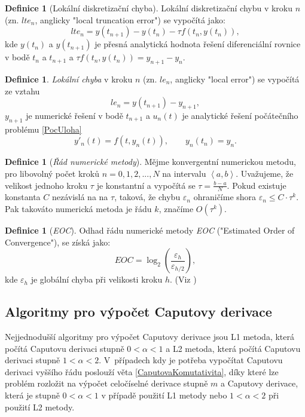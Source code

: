 \documentclass[a4paper,12pt,twoside]{article}
\theoremstyle{definition}
\newtheorem{defin}[veta]{Definice}
\theoremstyle{remark}
\numberwithin{equation}{section}
\numberwithin{table}{section}
\numberwithin{figure}{section}
\begin{document}
\begin{defin} [Lokální diskretizační chyba]
	Lokální diskretizační chybu v kroku $n$ (zn. $lte_{n}$, anglicky "local truncation error") se vypočítá jako:
	$$lte_{n} = y\left(t_{n+1}\right) -y\left(t_{n}\right) - \tau f\left(t_{n}, y\left(t_{n}\right)\right),$$
	kde $y\left(t_{n}\right)$ a $y\left(t_{n+1}\right)$ je přesná analytická hodnota řešení diferenciální rovnice v bodě $t_{n}$ a $t_{n+1}$ a $\tau f\left(t_{n}, y\left(t_{n}\right)\right) = y_{n+1} - y_{n}$.
\end{defin}

\begin{defin}
	\emph{Lokální chyba} v kroku $n$ (zn. $le_{n}$, anglicky "local error") se vypočítá ze vztahu
	$$le_{n} = y\left(t_{n+1}\right) - y_{n+1},$$
	$y_{n+1}$ je numerické řešení v bodě $t_{n+1}$ a $u_{n}\left(t\right)$ je analytické řešení počátečního problému \eqref{PocUloha}
	$$y'_{n}\left(t\right) = f\left(t,y_{n}\left(t\right)\right), \qquad y_{n}\left(t_{n}\right) = y_{n}.$$
\end{defin}

\begin{defin} [\emph{Řád numerické metody}]
	Mějme konvergentní numerickou metodu, pro libovolný počet kroků $n = 0,1,2, ..., N$ na intervalu $\left\langle a, b\right\rangle$. Uvažujeme, že velikost jednoho kroku $\tau$ je konstantní a vypočítá se $\tau = \frac{b-a}{N} $. Pokud existuje konstanta $C$ nezávislá na na $\tau$, taková, že chybu $\varepsilon_{n}$ ohraničíme shora $\varepsilon_{n} \leq C\cdot \tau^{k}$.
	Pak takováto numerická metoda je řádu $k$, značíme $O\left(\tau^{k}\right)$.
\end{defin}

\begin{defin} [\emph{EOC}] \label{EOC}
	Odhad řádu numerické metody \emph{EOC} ("Estimated Order of Convergence"), se získá jako:
	$$EOC = \log_{2}\left( \frac{\varepsilon_{h}}{\varepsilon_{h/2}} \right),$$
	kde $\varepsilon_{h}$ je globální chyba při velikosti kroku $h$. (Viz \cite{Garrappa2})
\end{defin}

\subsection{Algoritmy pro výpočet Caputovy derivace}
Nejjednodušší algoritmy pro výpočet Caputovy derivace jsou L1 metoda, která počítá Caputovu derivaci stupně $0<\alpha<1$ a L2 metoda, která počítá Caputovu derivaci stupně $1<\alpha<2$. V~případech kdy je potřeba vypočítat Caputovu derivaci vyššího řádu poslouží věta \ref{CaputovaKomutativita}, díky které lze problém rozložit na výpočet celočíselné derivace stupně $m$ a Caputovy derivace, která je stupně $0<\alpha<1$ v případě použití L1 metody nebo  $1<\alpha<2$ při použití L2 metody.
\end{document}
